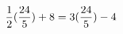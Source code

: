 \documentclass[preview]{standalone}
\begin{document}
\begin{align*}
\special{dvisvgm:raw <g id='unique000'>}\frac{1}{2} (\frac{24}{5}) + 8 = 3(\frac{24}{5}) - 4\special{dvisvgm:raw </g>}
\end{align*}
\end{document}
